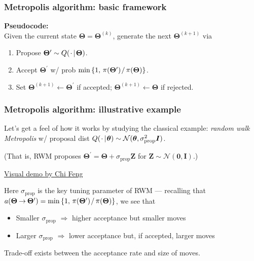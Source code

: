 \documentclass[18pt]{beamer}
\newenvironment{tightItemize}[1][]{%
  \vspace{-.3\baselineskip}%
  \begin{itemize}[#1]
  \addtolength\itemsep{-.1\baselineskip}
}{
  \end{itemize}
}
\newenvironment{tightEnumerate}[1][1.]{%
  \vspace{-.3\baselineskip}%
  \begin{enumerate}[#1]
  \addtolength\itemsep{-.1\baselineskip}
}{
  \end{enumerate}
}
\newcommand{\smallCap}[1]{{\small \MakeUppercase{#1}}}
\newcommand{\given}{\thinnerspace | \thinnerspace}
\newcommand{\divby}{\thinnerspace /}
\newcommand{\thinnerspace}{\mskip.5\thinmuskip}
\newcommand{\placeholder}{\thinnerspace \cdot \thinnerspace}
\newcommand{\tightTo}{\mskip-.4\thinmuskip \to \mskip-.4\thinmuskip}
\newcommand{\normalDist}{\mathcal{N}}
\newcommand{\propKernel}{Q}
\newcommand{\propMarker}{\prime}
\newcommand{\acceptProb}{a}
\DeclareMathOperator{\density}{\pi}
\newcommand{\randVar}{\Theta}
\newcommand{\bparam}{\bm{\theta}}
\newcommand{\brandVar}{\bm{\randVar}}
\begin{document}
\renewcommand{\frametitleText}{Metropolis algorithm: basic framework}
\begin{frame}
\frametitle{\frametitleText}
\textbf{Pseudocode:}\\

Given the current state $\bm{\randVar} = \bm{\randVar}^{(k)}$, generate the next $\bm{\randVar}^{(k+1)}$ via
\vspace*{-.2\baselineskip}
\begin{tightEnumerate}
\item Propose $\bm{\randVar}^\propMarker \sim \propKernel( \placeholder \given \brandVar )$.
\item Accept $\bm{\randVar}^\propMarker$ w/ prob
$ \min \left\{
		1, \,
		\density(\brandVar^\propMarker)
		\divby
		\density(\brandVar)
	\right\}$.
\item Set $\bm{\randVar}^{(k+1)} \gets \bm{\randVar}^\propMarker$ if accepted;
	$\bm{\randVar}^{(k+1)} \gets \bm{\randVar}$ if rejected.
\end{tightEnumerate}
\end{frame}


\renewcommand{\frametitleText}{Metropolis algorithm: illustrative example}
\begin{frame}
\frametitle{\frametitleText}
Let's get a feel of how it works by studying the classical example:
\textit{random walk Metropolis} w/ proposal dist $\propKernel( \placeholder \given \bparam) \sim \normalDist(\bparam, \sigma_{\textrm{prop}}^2 \bm{I})$.

(That is, \smallCap{rwm} proposes $\brandVar^\propMarker = \brandVar + \sigma_\mathrm{prop} \bm{Z}$ for $\bm{Z} \sim \normalDist(\bm{0}, \bm{I})$.)

\pause
\smallskip
{\centering
\href{https://chi-feng.github.io/mcmc-demo/app.html?algorithm=RandomWalkMH}{%
	\textcolor{linkColor}{%
		Visual demo by Chi Feng%
	}%
}
\par}

\pause
\medskip
Here $\sigma_\mathrm{prop}$ is the key tuning parameter of \smallCap{rwm} ---
recalling that 
$\acceptProb(\brandVar \tightTo \brandVar^\propMarker) =
\min \left\{
	1, \,
	\density(\brandVar^\propMarker) \divby \density(\brandVar)
\right\}$,
we see that
\begin{tightItemize}
\item Smaller $\sigma_\mathrm{prop}$ $\Rightarrow$ higher acceptance but smaller moves
\item Larger $\sigma_\mathrm{prop}$ $\Rightarrow$ lower acceptance but, if accepted, larger moves
\end{tightItemize}

\pause
\smallskip
Trade-off exists between the acceptance rate and size of moves.
\end{frame}
\end{document}
